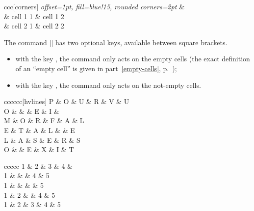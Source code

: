 \documentclass[dvipsnames]{article}
\begin{document}
\smallskip
\begin{Code}[width=9cm,show-output]
\renewcommand{\arraystretch}{1.3}
\begin{NiceTabular}{ccc}[corners]
\CodeBefore
  \emph{\TikzEveryCell
    {
      offset=1pt,
      fill=blue!15,
      rounded corners=2pt
    }}
\Body
  &  \\
  & cell 1 1 & cell 1 2 \\
  & cell 2 1 & cell 2 2
\end{NiceTabular}
\end{Code}

\bigskip
The command |\TikzEveryCell| has two optional keys, available between square brackets.
\begin{itemize}
\item with the key , the command only acts on the empty cells
(the exact definition of an ``empty cell'' is given in part~\ref{empty-cells},
p.~\pageref{empty-cells}); 

\item with the key , the command only acts on the not-empty cells.
\end{itemize}

\medskip
\begin{Code}[width=9cm,show-output]
\renewcommand{\arraystretch}{1.4}
\begin{NiceTabular}{cccccc}[hvlines]
  P & O & U & R & V & U \\
  O &   &   & E & I &   \\
  M & O & R & F & A & L \\
  E & T & A & L &   & E \\
  L & A & S & E & R & S \\
  O &   & E & X & I & T
\CodeAfter
  \emph{}
\end{NiceTabular}
\end{Code}


\bigskip
\bigskip
\begin{Code}[width=10cm,show-output]
\begin{NiceTabular}{ccccc}
1 & 2 & 3 & 4 &   \\
1 &   &   & 4 & 5 \\
1 &   &   &   & 5 \\
1 & 2 &   & 4 & 5 \\
1 & 2 & 3 & 4 & 5 \\
\CodeAfter
  \emph{}
\end{NiceTabular}
\end{Code}
\end{document}
